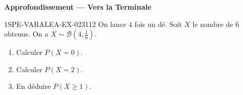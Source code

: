\begin{center}\textbf{Approfondissement — Vers la Terminale}\end{center}
\begin{exercice}{1SPE-VARALEA-EX-023}{1}{12}
On lance $4$ fois un dé. Soit $X$ le nombre de $6$ obtenus. On a $X \sim \mathcal{B}(4, \frac{1}{6})$.

\begin{enumerate}
  \item Calculer $P(X = 0)$.
  \item Calculer $P(X = 2)$.
  \item En déduire $P(X \geq 1)$.
\end{enumerate}
\end{exercice}
